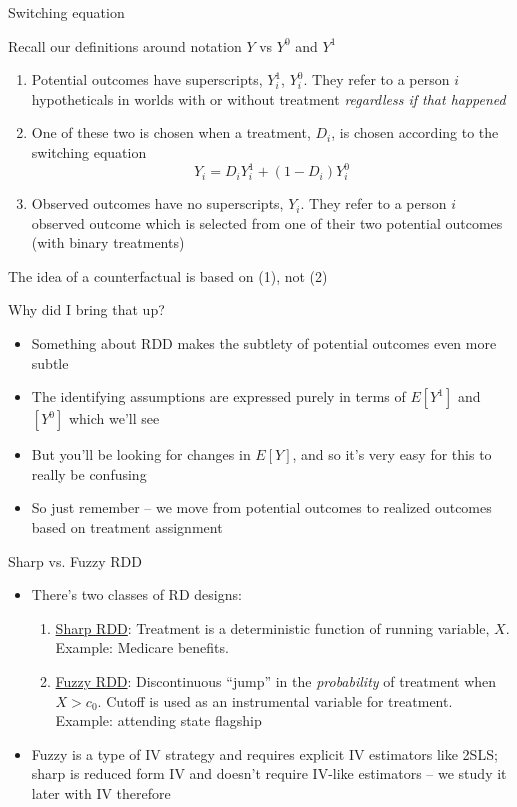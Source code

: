 \documentclass{beamer}
\begin{document}
\begin{frame}{Switching equation}

Recall our definitions around notation $Y$ vs $Y^0$ and $Y^1$

\begin{enumerate}
\item Potential outcomes have superscripts, $Y^1_i$, $Y_i^0$. They refer to a person $i$ hypotheticals in worlds with or without treatment \emph{regardless if that happened}
\item One of these two is chosen when a treatment, $D_i$, is chosen according to the switching equation $$Y_i = D_iY^1_i + (1-D_i)Y^0_i$$
\item Observed outcomes have no superscripts, $Y_i$. They refer to a person $i$ observed outcome which is selected from one of their two potential outcomes (with binary treatments)
\end{enumerate}
\bigskip
The idea of a counterfactual is based on (1), not (2)

\end{frame}


\begin{frame}{Why did I bring that up?}

\begin{itemize}

\item Something about RDD makes the subtlety of potential outcomes even more subtle
\item The identifying assumptions are expressed purely in terms of $E[Y^1]$ and $[Y^0]$ which we'll see
\item But you'll be looking for changes in $E[Y]$, and so it's very easy for this to really be confusing
\item So just remember -- we move from potential outcomes to realized outcomes based on treatment assignment

\end{itemize}

\end{frame}



\begin{frame}{Sharp vs. Fuzzy RDD}
	
\begin{itemize}
\item There's two classes of RD designs:
	\begin{enumerate}
	\item \underline{Sharp RDD}: Treatment is a deterministic function of running variable, $X$. Example: Medicare benefits.  
	\item \underline{Fuzzy RDD}: Discontinuous ``jump'' in the \emph{probability} of treatment when $X>c_0$.  Cutoff is used as an instrumental variable for treatment.  Example: attending state flagship
	\end{enumerate}
\item Fuzzy is a type of IV strategy and requires explicit IV estimators like 2SLS; sharp is reduced form IV and doesn't require IV-like estimators -- we study it later with IV therefore
\end{itemize}	

\end{frame}	
\end{document}
